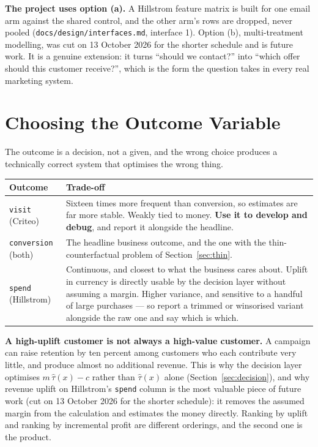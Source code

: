 \documentclass[11pt,a4paper]{article}
\begin{document}
\textbf{The project uses option (a).} A Hillstrom feature matrix is built for one email arm against
the shared control, and the other arm's rows are dropped, never pooled
(\texttt{docs/design/interfaces.md}, interface 1). Option (b), multi-treatment modelling, was cut on
13 October 2026 for the shorter schedule and is future work. It is a genuine extension: it turns
``should we contact?'' into ``which offer should this customer receive?'', which is the form the
question takes in every real marketing system.

\section{Choosing the Outcome Variable}
\label{sec:outcome}

The outcome is a decision, not a given, and the wrong choice produces a technically correct system
that optimises the wrong thing.

\begin{tabularx}{\textwidth}{@{}L{3.2cm}X@{}}
\toprule
\textbf{Outcome} & \textbf{Trade-off} \\
\midrule
\texttt{visit} (Criteo) & Sixteen times more frequent than conversion, so estimates are far more
stable. Weakly tied to money. \textbf{Use it to develop and debug}, and report it alongside the
headline. \\
\texttt{conversion} (both) & The headline business outcome, and the one with the thin-counterfactual
problem of Section~\ref{sec:thin}. \\
\texttt{spend} (Hillstrom) & Continuous, and closest to what the business cares about. Uplift in
currency is directly usable by the decision layer without assuming a margin. Higher variance, and
sensitive to a handful of large purchases --- so report a trimmed or winsorised variant alongside
the raw one and say which is which. \\
\bottomrule
\end{tabularx}

\begin{alertbox}
\textbf{A high-uplift customer is not always a high-value customer.} A campaign can raise retention
by ten percent among customers who each contribute very little, and produce almost no additional
revenue. This is why the decision layer optimises $m\,\hat\tau(x) - c$ rather than $\hat\tau(x)$
alone (Section~\ref{sec:decision}), and why revenue uplift on Hillstrom's \texttt{spend} column is
the most valuable piece of future work (cut on 13 October 2026 for the shorter schedule): it
removes the assumed margin from the calculation and estimates the money directly. Ranking by uplift and ranking by incremental profit are different
orderings, and the second one is the product.
\end{alertbox}
\end{document}
